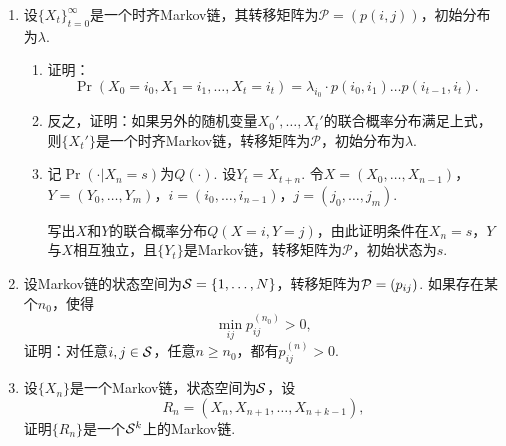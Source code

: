 \begin{enumerate}[wide, labelindent=0pt]

    \item \label{exercise:Markov-property} 设$\{X_t\}_{t=0}^{\infty}$是一个时齐Markov链，其转移矩阵为$\mathcal P=(p(i,j))$，初始分布为$\lambda$.
    \begin{enumerate}
        \item 证明：
        \[\Pr(X_0=i_0,X_1=i_1,\dots,X_t=i_t)=\lambda_{i_0}\cdot p(i_0,i_1)\dots p(i_{t-1},i_t).\]
        \item 反之，证明：如果另外的随机变量$X_0',\dots,X_t'$的联合概率分布满足上式，则$\{X_t'\}$是一个时齐Markov链，转移矩阵为$\mathcal P$，初始分布为$\lambda$.
        \item 记$\Pr(\cdot|X_n=s)$为$Q(\cdot)$. 设$Y_t=X_{t+n}$. 令$X=(X_0,\dots, X_{n-1})$，$Y=(Y_0,\dots,Y_m)$，$i=(i_0,\dots,i_{n-1})$，$j=(j_0,\dots,j_{m})$. 
        
        写出$X$和$Y$的联合概率分布$Q(X=i,Y=j)$，由此证明条件在$X_{n}=s$，$Y$与$X$相互独立，且$\{Y_t\}$是Markov链，转移矩阵为$\mathcal P$，初始状态为$s$.
    \end{enumerate}

    \item \label{exercise:ergodic} 设Markov链的状态空间为$\mathcal S=\{1,\dots,N\}$，转移矩阵为$\mathcal P=(p_{ij})$. 如果存在某个$n_0$，使得
    \[
        \min_{ij}p_{ij}^{(n_0)}>0,
    \]
    证明：对任意$i,j\in\mathcal S$，任意$n\geq n_0$，都有$p_{ij}^{(n)}>0$.

    \item \label{exercise:MDP-k-step} 设$\{X_n\}$是一个Markov链，状态空间为$\mathcal S$，设
    \[R_{n}=(X_n,X_{n+1},\dots,X_{n+k-1}),\]
    证明$\{R_n\}$是一个$\mathcal S^k$上的Markov链.


\end{enumerate}
